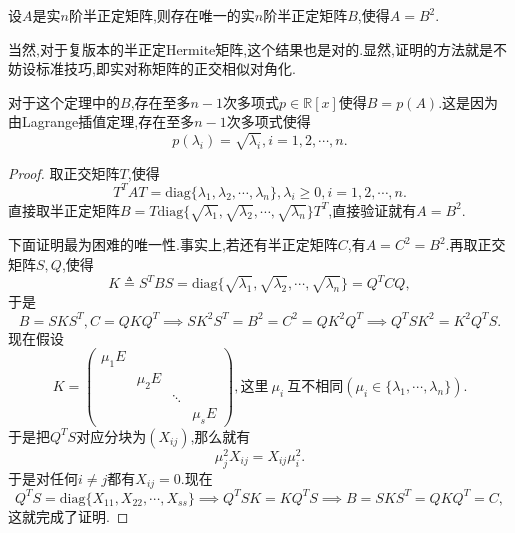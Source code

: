 \documentclass[../../main.tex]{subfiles}%
\begin{document}
\begin{theorem}[半正定矩阵开方唯一]\label{theorem:半正定矩阵开方唯一}
设\( A \)是实\( n \)阶半正定矩阵,则存在唯一的实\( n \)阶半正定矩阵\( B \),使得\( A = B^2 \).
\end{theorem}
\begin{note}
当然,对于复版本的半正定Hermite矩阵,这个结果也是对的.显然,证明的方法就是不妨设标准技巧,即实对称矩阵的正交相似对角化.
\end{note}
\begin{remark}
对于这个定理中的\( B \),存在至多\( n - 1 \)次多项式\( p \in \mathbb{R}[x] \)使得\( B = p(A) \).这是因为由Lagrange插值定理,存在至多\( n - 1 \)次多项式使得
\[
p(\lambda_i) = \sqrt{\lambda_i}, i = 1, 2, \cdots, n.
\]
\end{remark}
\begin{proof}
取正交矩阵\( T \),使得
\[
T^T A T = \text{diag}\{\lambda_1, \lambda_2, \cdots, \lambda_n\}, \lambda_i \geqslant  0, i = 1, 2, \cdots, n.
\]
直接取半正定矩阵\( B = T \text{diag}\{\sqrt{\lambda_1}, \sqrt{\lambda_2}, \cdots, \sqrt{\lambda_n}\} T^T \),直接验证就有\( A = B^2 \).

下面证明最为困难的唯一性.事实上,若还有半正定矩阵\( C \),有\( A = C^2 = B^2 \).再取正交矩阵\( S, Q \),使得
\[
K \triangleq S^T B S = \text{diag}\{\sqrt{\lambda_1}, \sqrt{\lambda_2}, \cdots, \sqrt{\lambda_n}\} = Q^T C Q,
\]
于是
\[
B = S K S^T, C = Q K Q^T \implies S K^2 S^T =B^2=C^2= Q K^2 Q^T \implies Q^T S K^2 = K^2 Q^T S.
\]
现在假设
\[
K = \begin{pmatrix}
\mu_1 E \\
& \mu_2 E \\
& & \ddots \\
& & & \mu_s E
\end{pmatrix}, \text{这里}\ \mu_i\ \text{互不相同}(\mu_i\in \{\lambda_1,\cdots,\lambda_n\}).
\]
于是把\( Q^T S \)对应分块为\( (X_{ij}) \),那么就有
\[
\mu_j^2 X_{ij} = X_{ij} \mu_i^2.
\]
于是对任何\( i \neq j \)都有\( X_{ij} = 0 \).现在
\[
Q^T S = \text{diag}\{X_{11}, X_{22}, \cdots, X_{ss}\} \implies Q^T S K = K Q^T S \implies B = S K S^T = Q K Q^T = C,
\]
这就完成了证明.
\end{proof}
\end{document}
